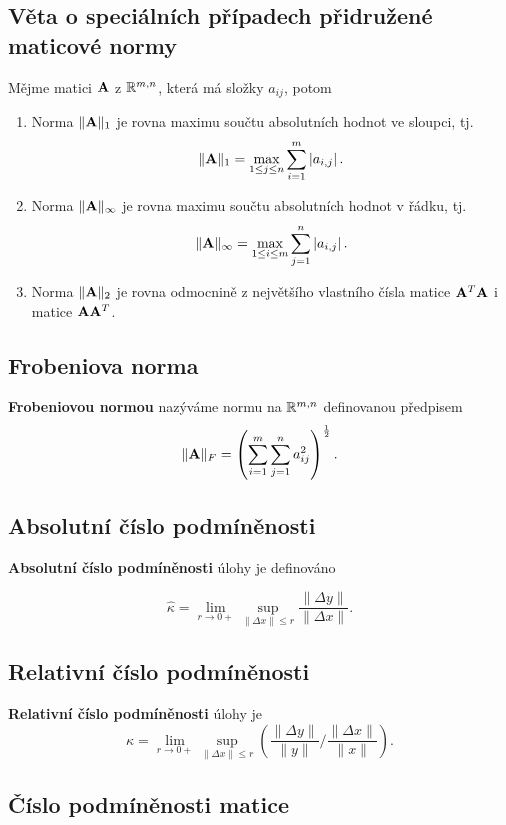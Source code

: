\subsection*{Věta o speciálních případech přidružené maticové normy}

Mějme matici $\mathbf{A}$ z $\mathbb{R}^{m,n}$, která má složky $a_{ij}$, potom

\begin{enumerate}
	\item Norma $\| \mathbf{A} \|_{1}$ je rovna maximu součtu absolutních hodnot ve sloupci, tj.
	      \[ \| \mathbf{A} \|_{1} = \max_{1 \leq j \leq n} \sum_{i = 1}^m |a_{i,j}|\,. \]
	\item Norma $\| \mathbf{A} \|_{\infty}$ je rovna maximu součtu absolutních hodnot v řádku,
	      tj.
	      \[ \| \mathbf{A} \|_{\infty} = \max_{1 \leq i \leq m} \sum_{j = 1}^n |a_{i,j}|\,. \]
	\item Norma $\| \mathbf{A} \|_{2}$ je rovna odmocnině z největšího vlastního čísla matice
	      $\mathbf{A}^T\mathbf{A}$ i matice $\mathbf{A}\mathbf{A}^T$.
\end{enumerate}

\subsection*{Frobeniova norma}

\textbf{Frobeniovou normou} nazýváme normu na $\mathbb{R}^{m,n}$ definovanou předpisem
\[ \| \mathbf{A} \|_{F} = \left( \sum_{i=1}^{m}  \sum_{j=1}^{n} a_{ij}^2 \right)^\frac{1}{2}. \]

\subsection*{Absolutní číslo podmíněnosti}

\textbf{Absolutní číslo podmíněnosti} úlohy je definováno

\[ \hat\kappa = \lim_{r \to 0+} \sup_{ \| \Delta x \| \leq r} \dfrac{ \| \Delta y \| }{ \| \Delta x \| }. \]

\subsection*{Relativní číslo podmíněnosti}

\textbf{Relativní číslo podmíněnosti} úlohy je
\[ \kappa = \lim_{r \to 0+} \sup_{ \| \Delta x \| \leq r}
	\left({ \dfrac {\| \Delta y \| }{\|y\|}} \Big/ { \dfrac{ \|\Delta x\| }{\|x\|}}\right). \]

\subsection*{Číslo podmíněnosti matice}

